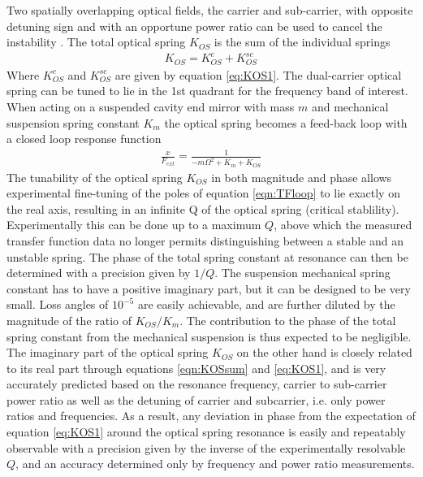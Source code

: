 Two spatially overlapping optical fields, the carrier and sub-carrier, with opposite detuning sign and with an opportune power ratio can be used to cancel the instability \cite{Corbitt07}. The total optical spring $K_{OS}$ is the sum of the individual springs
\begin{eqnarray}
\label{eqn:KOSsum}
K_{OS}=K_{OS}^c+K_{OS}^{sc}
\end{eqnarray}
Where $K_{OS}^c$ and $K_{OS}^{sc}$ are given by equation \ref{eq:KOS1}. The dual-carrier optical spring
can be tuned to lie in the 1st quadrant for the frequency band of interest. When acting on a suspended cavity end mirror with mass $m$ and mechanical suspension spring constant $K_m$ the optical spring becomes a feed-back loop with a closed loop response function
\begin{eqnarray}
\label{eqn:TFloop}
\frac{x}{F_{ext}}=\frac{1}{-m\Omega^2+K_m+K_{OS}}
\end{eqnarray}
The tunability of the optical spring $K_{OS}$ in both magnitude and phase allows experimental fine-tuning of the poles of equation \ref{eqn:TFloop} to lie exactly on the real axis, resulting in an infinite Q of the optical spring (critical stablility).
Experimentally this can be done up to a maximum $Q$, above which the measured transfer function data no longer permits distinguishing between a stable and an unstable spring. The phase of the total spring constant at resonance can then be determined with a precision given by $1/Q$.
The suspension mechanical spring constant has to have a positive imaginary part, but it can be designed to be very small. Loss angles of $10^{-5}$ are easily achievable, and are further diluted by the magnitude of the ratio of $K_{OS}/K_m$. The contribution to the phase of the total spring constant from the mechanical suspension is thus expected to be negligible. The imaginary part of the optical spring $K_{OS}$ on the other hand is closely related to its real part through equations \ref{eqn:KOSsum} and \ref{eq:KOS1}, and is very accurately predicted based on the resonance frequency, carrier to sub-carrier power ratio as well as the detuning of carrier and subcarrier, i.e. only power ratios and frequencies. As a result, any deviation in phase from the expectation of equation \ref{eq:KOS1} around the optical spring resonance is easily and repeatably observable with a precision given by the inverse of the experimentally resolvable $Q$, and an accuracy determined only by frequency and power ratio measurements.




